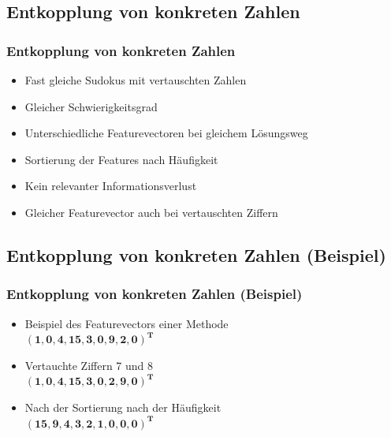 \documentclass[accentcolor=tud6b,colorbacktitle,inverttitle,landscape,german,presentation,t]{tudbeamer}
\begin{document}
	\subsection{Entkopplung von konkreten Zahlen}
		\begin{frame}
		\frametitle{Entkopplung von konkreten Zahlen}
		\begin{itemize}
		\item Fast gleiche Sudokus mit vertauschten Zahlen
		\item Gleicher Schwierigkeitsgrad
		\item Unterschiedliche Featurevectoren bei gleichem Lösungsweg
		\item Sortierung der Features nach Häufigkeit
		\item Kein relevanter Informationsverlust
		\item Gleicher Featurevector auch bei vertauschten Ziffern
		\end{itemize}
		\end{frame}

	\subsection{Entkopplung von konkreten Zahlen (Beispiel)}
		\begin{frame}
		\frametitle{Entkopplung von konkreten Zahlen (Beispiel)}
		\begin{itemize}
		\item Beispiel des Featurevectors einer Methode\\$\mathbf{(1, 0, 4, 15, 3, 0, 9, 2, 0)^{T}}$
		\item Vertauchte Ziffern 7 und 8\\$\mathbf{(1, 0, 4, 15, 3, 0, 2, 9, 0)^{T}}$
		\item Nach der Sortierung nach der Häufigkeit\\$\mathbf{(15, 9, 4, 3, 2, 1, 0, 0, 0)^{T}}$
		\end{itemize}
		\end{frame}
\end{document}
